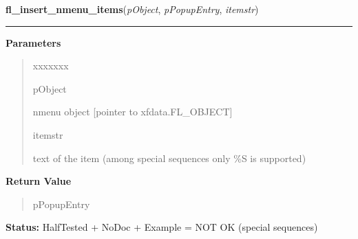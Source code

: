 \hspace{.8\funcindent}\begin{boxedminipage}{\funcwidth}

    \raggedright \textbf{fl\_insert\_nmenu\_items}(\textit{pObject}, \textit{pPopupEntry}, \textit{itemstr})

    \vspace{-1.5ex}

    \rule{\textwidth}{0.5\fboxrule}
\setlength{\parskip}{2ex}
\setlength{\parskip}{1ex}
      \textbf{Parameters}
      \vspace{-1ex}

      \begin{quote}
        \begin{Ventry}{xxxxxxx}

          \item[pObject]

          nmenu object [pointer to xfdata.FL\_OBJECT]

          \item[itemstr]

          text of the item (among special sequences only \%S is supported)

        \end{Ventry}

      \end{quote}

      \textbf{Return Value}
    \vspace{-1ex}

      \begin{quote}
      pPopupEntry

      \end{quote}

\textbf{Status:} HalfTested + NoDoc + Example = NOT OK (special sequences)



    \end{boxedminipage}

    \label{xformslib:library:fl_replace_nmenu_item}

    \vspace{0.5ex}

